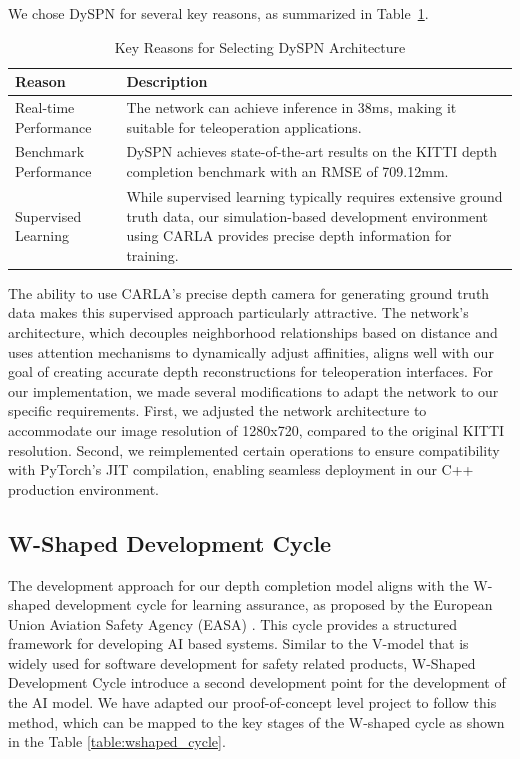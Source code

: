 We chose \ac{DySPN} for several key reasons, as summarized in Table~\ref{table:dyspn_reasons}.

\begin{table}[h!]
\centering
\begin{tabular}{@{}p{4.5cm}p{9.3cm}@{}}
\toprule
\textbf{Reason} & \textbf{Description} \\
\midrule
Real-time Performance & The network can achieve inference in 38ms, making it suitable for teleoperation applications. \\
\midrule
Benchmark Performance & \ac{DySPN} achieves state-of-the-art results on the KITTI depth completion benchmark with an RMSE of 709.12mm. \\
\midrule
Supervised Learning  & While supervised learning typically requires extensive ground truth data, our simulation-based development environment using CARLA provides precise depth information for training. \\
\bottomrule
\end{tabular}
\caption{Key Reasons for Selecting \ac{DySPN} Architecture}
\label{table:dyspn_reasons}
\end{table}

The ability to use CARLA's precise depth camera for generating ground truth data makes this supervised approach particularly attractive. The network's architecture, which decouples neighborhood relationships based on distance and uses attention mechanisms to dynamically adjust affinities, aligns well with our goal of creating accurate depth reconstructions for teleoperation interfaces.
For our implementation, we made several modifications to adapt the network to our specific requirements. First, we adjusted the network architecture to accommodate our image resolution of 1280x720, compared to the original KITTI resolution. Second, we reimplemented certain operations to ensure compatibility with PyTorch's JIT compilation, enabling seamless deployment in our C++ production environment.

\subsection{W-Shaped Development Cycle}
The development approach for our depth completion model aligns with the W-shaped development cycle for learning assurance, as proposed by the European Union Aviation Safety Agency (EASA) \cite{easa2024}. This cycle provides a structured framework for developing \ac{AI} based systems.
Similar to the V-model \cite{vmodel} that is widely used for software development for safety related products, W-Shaped Development Cycle introduce a second development point for the development of the \ac{AI} model.
We have adapted our proof-of-concept level project to follow this method, which can be mapped to the key stages of the W-shaped cycle as shown in the Table \ref{table:wshaped_cycle}.

